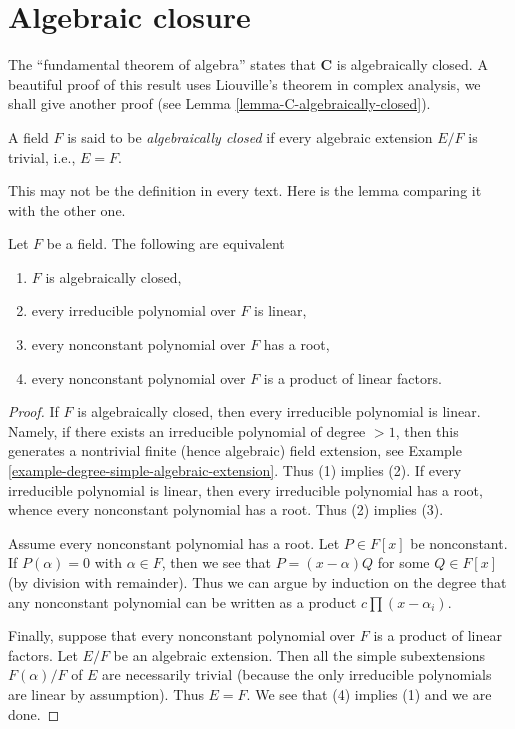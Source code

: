 \section{Algebraic closure}
\label{section-algebraic-closure}

\noindent
The ``fundamental theorem of algebra'' states that $\mathbf{C}$ is
algebraically closed. A beautiful proof of this result uses
Liouville's theorem in complex analysis, we shall give another
proof (see Lemma \ref{lemma-C-algebraically-closed}).

\begin{definition}
\label{definition-algebraically-closed}
A field $F$ is said to be {\it algebraically closed} if every algebraic
extension $E/F$ is trivial, i.e., $E = F$.
\end{definition}

\noindent
This may not be the definition in every text. Here is the lemma comparing
it with the other one.

\begin{lemma}
\label{lemma-algebraically-closed}
Let $F$ be a field. The following are equivalent
\begin{enumerate}
\item $F$ is algebraically closed,
\item every irreducible polynomial over $F$ is linear,
\item every nonconstant polynomial over $F$ has a root,
\item every nonconstant polynomial over $F$ is a product of linear factors.
\end{enumerate}
\end{lemma}

\begin{proof}
If $F$ is algebraically closed, then every irreducible polynomial is linear.
Namely, if there exists an irreducible polynomial of degree $> 1$, then
this generates a nontrivial finite (hence algebraic) field extension, see
Example \ref{example-degree-simple-algebraic-extension}.
Thus (1) implies (2). If every irreducible polynomial
is linear, then every irreducible polynomial has a root, whence every
nonconstant polynomial has a root. Thus (2) implies (3).

\medskip\noindent
Assume every nonconstant polynomial has a root. Let $P \in F[x]$
be nonconstant. If $P(\alpha) = 0$ with $\alpha \in F$, then we see
that $P = (x - \alpha)Q$ for some $Q \in F[x]$ (by division with remainder).
Thus we can argue by induction on the degree that any nonconstant
polynomial can be written as a product $c \prod (x - \alpha_i)$.

\medskip\noindent
Finally, suppose that every nonconstant polynomial over $F$ is a product of
linear factors. Let $E/F$ be an algebraic extension. Then all the simple
subextensions $F(\alpha)/F$ of $E$ are necessarily trivial (because the
only irreducible polynomials are linear by assumption). Thus $E = F$.
We see that (4) implies (1) and we are done.
\end{proof}

